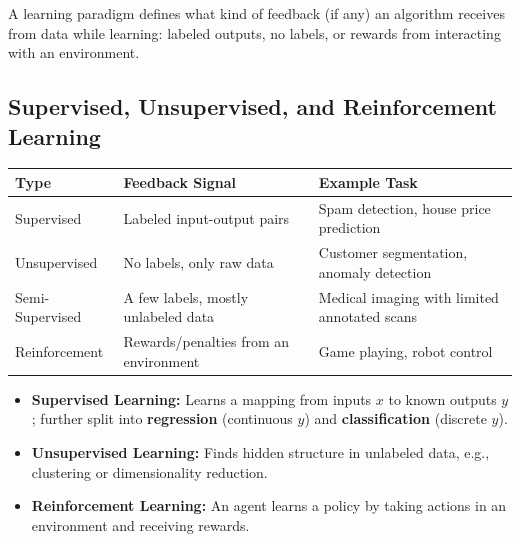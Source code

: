 \documentclass[11pt,a4paper]{article}
\begin{document}
\begin{definitionbox}
A learning paradigm defines what kind of feedback (if any) an algorithm receives from data while learning: labeled outputs, no labels, or rewards from interacting with an environment.
\end{definitionbox}

\subsection{Supervised, Unsupervised, and Reinforcement Learning}
\begin{center}
\begin{tabular}{@{}p{2.6cm}p{5.4cm}p{5.2cm}@{}}
\toprule
\rowcolor{primary!15}
\textbf{Type} & \textbf{Feedback Signal} & \textbf{Example Task} \\
\midrule
Supervised & Labeled input-output pairs & Spam detection, house price prediction \\
Unsupervised & No labels, only raw data & Customer segmentation, anomaly detection \\
Semi-Supervised & A few labels, mostly unlabeled data & Medical imaging with limited annotated scans \\
Reinforcement & Rewards/penalties from an environment & Game playing, robot control \\
\bottomrule
\end{tabular}
\end{center}

\begin{itemize}[leftmargin=*]
  \item \textbf{Supervised Learning:} Learns a mapping from inputs $x$ to known outputs $y$; further split into \textbf{regression} (continuous $y$) and \textbf{classification} (discrete $y$).
  \item \textbf{Unsupervised Learning:} Finds hidden structure in unlabeled data, e.g., clustering or dimensionality reduction.
  \item \textbf{Reinforcement Learning:} An agent learns a policy by taking actions in an environment and receiving rewards.
\end{itemize}
\end{document}
